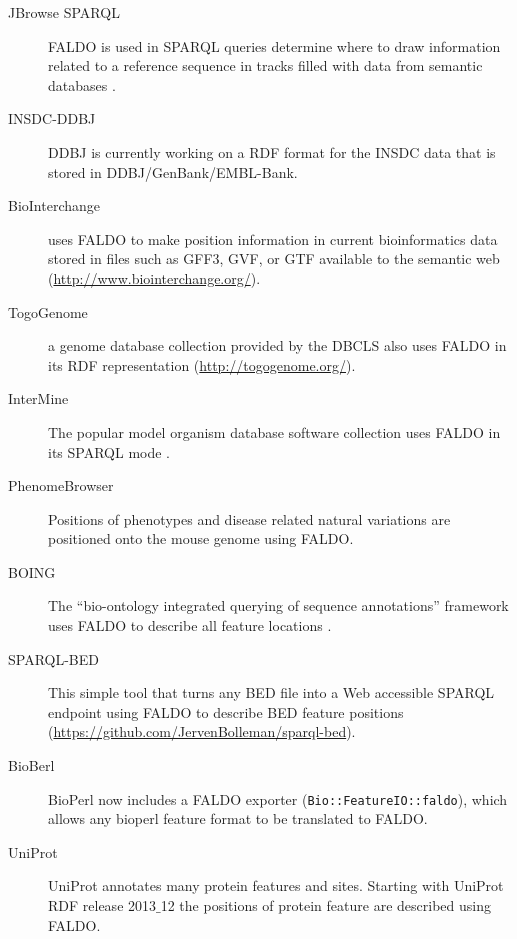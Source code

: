 \begin{description}
\item[JBrowse SPARQL] FALDO is used in SPARQL queries determine where to draw information related to a reference sequence in tracks filled with data from semantic databases \cite{JBrowse}.
\item[INSDC-DDBJ] DDBJ is currently working on a RDF format for the INSDC data that is stored in DDBJ/GenBank/EMBL-Bank.
\item[BioInterchange] uses FALDO to make position information in current bioinformatics data stored in files such as GFF3, GVF, or GTF available to the semantic web (\url{http://www.biointerchange.org/}).
\item[TogoGenome] a genome database collection provided by the DBCLS also uses FALDO in its RDF representation (\url{http://togogenome.org/}).
\item[InterMine] The popular model organism database software collection uses FALDO in its SPARQL mode \cite{InterMine}.
\item[PhenomeBrowser] Positions of phenotypes and disease related natural variations are positioned onto the mouse genome using FALDO.
\item[BOING] The ``bio-ontology integrated querying of sequence annotations'' framework uses FALDO to describe all feature locations \cite{BOING}.
\item[SPARQL-BED] This simple tool that turns any BED file into a Web accessible SPARQL endpoint using FALDO to describe BED feature positions (\url{https://github.com/JervenBolleman/sparql-bed}).
\item[BioBerl] BioPerl\cite{BioPerl2002} now includes a FALDO exporter (\texttt{Bio::FeatureIO::faldo}), which allows any bioperl feature format to be translated to FALDO.
\item[UniProt] UniProt annotates many protein features and sites. Starting with UniProt RDF release 2013$\_$12 the positions of protein feature are described using FALDO.
\end{description}


